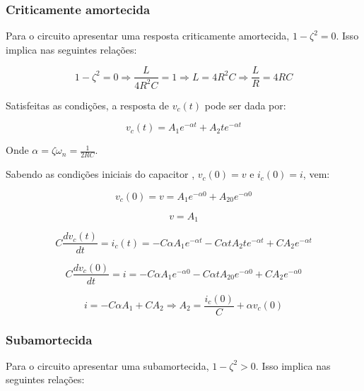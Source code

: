 \documentclass[12pt,fleqn]{book} %
\begin{document}
{            
            \subsubsection{Criticamente amortecida}
            
Para o circuito apresentar uma resposta criticamente amortecida, $1-\zeta^2 = 0$. Isso implica nas seguintes relações:

\begin{equation}
1-\zeta^2 = 0 \Rightarrow \frac{L}{4R^2C} = 1 \Rightarrow L = 4R^2C \Rightarrow \frac{L}{R} = 4RC
\end{equation}

Satisfeitas as condições, a resposta de $v_c(t)$ pode ser dada por:

\begin{equation}
v_c(t) = A_1e^{-\alpha t} + A_2te^{-\alpha t}
\end{equation}

Onde $\alpha = \zeta\omega_n = \frac{1}{2RC}$. 

Sabendo as condições iniciais do capacitor , $v_c(0) = v$ e $i_c(0) = i$, vem:

\begin{equation}
v_c(0) = v = A_1e^{-\alpha 0} + A_20e^{-\alpha 0}
\end{equation}

\begin{equation}
v = A_1
\end{equation}

\begin{equation}
C\frac{dv_c(t)}{dt} = i_c(t) = -C\alpha A_1e^{-\alpha t}  -C\alpha tA_2te^{-\alpha t} + CA_2e^{-\alpha t}
\end{equation}

\begin{equation}
C\frac{dv_c(0)}{dt} = i = -C\alpha A_1e^{-\alpha 0}  -C\alpha tA_20e^{-\alpha 0} + CA_2e^{-\alpha 0}
\end{equation}

\begin{equation}
i = -C\alpha A_1 + CA_2 \Rightarrow A_2 = \frac{i_c(0)}{C}+\alpha v_c(0)
\end{equation}
            
            
            \subsubsection{Subamortecida}

Para o circuito apresentar uma subamortecida, $1-\zeta^2 > 0$. Isso implica nas seguintes relações:

}
\end{document}

